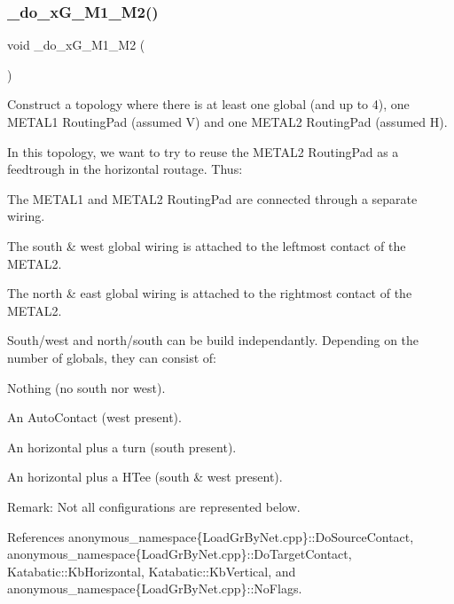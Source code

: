 \subsubsection{\texorpdfstring{\+\_\+do\+\_\+x\+G\+\_\+M1\+\_\+M2()}{\_do\_xG\_1M1\_1M2()}}
{\footnotesize\ttfamily void \+\_\+do\+\_\+x\+G\+\_\+M1\+\_\+M2 (\begin{DoxyParamCaption}{ }\end{DoxyParamCaption})\hspace{0.3cm}{\ttfamily [private]}}

Construct a topology where there is at least one global (and up to 4), one {\ttfamily M\+E\+T\+A\+L1} Routing\+Pad (assumed V) and one {\ttfamily M\+E\+T\+A\+L2} Routing\+Pad (assumed H).

In this topology, we want to try to reuse the {\ttfamily M\+E\+T\+A\+L2} Routing\+Pad as a feedtrough in the horizontal routage. Thus\+:
\begin{DoxyItemize}
\item The {\ttfamily M\+E\+T\+A\+L1} and {\ttfamily M\+E\+T\+A\+L2} Routing\+Pad are connected through a separate wiring.
\item The south \& west global wiring is attached to the leftmost contact of the {\ttfamily M\+E\+T\+A\+L2}.
\item The north \& east global wiring is attached to the rightmost contact of the {\ttfamily M\+E\+T\+A\+L2}.
\end{DoxyItemize}

South/west and north/south can be build independantly. Depending on the number of globals, they can consist of\+:
\begin{DoxyItemize}
\item Nothing (no south nor west).
\item An Auto\+Contact (west present).
\item An horizontal plus a turn (south present).
\item An horizontal plus a H\+Tee (south \& west present).
\end{DoxyItemize}

\begin{DoxyParagraph}{Remark\+:}
Not all configurations are represented below.
\end{DoxyParagraph}
 

References anonymous\+\_\+namespace\{\+Load\+Gr\+By\+Net.\+cpp\}\+::\+Do\+Source\+Contact, anonymous\+\_\+namespace\{\+Load\+Gr\+By\+Net.\+cpp\}\+::\+Do\+Target\+Contact, Katabatic\+::\+Kb\+Horizontal, Katabatic\+::\+Kb\+Vertical, and anonymous\+\_\+namespace\{\+Load\+Gr\+By\+Net.\+cpp\}\+::\+No\+Flags.

